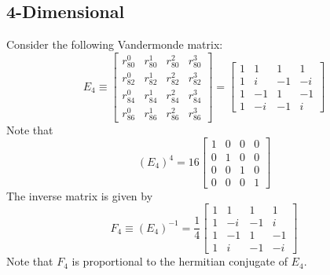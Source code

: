 \subsection{4-Dimensional}
Consider the following Vandermonde matrix:
\begin{equation}
    E_{4} \equiv \begin{bmatrix}
        r_{80}^{0} & r_{80}^{1} & r_{80}^{2} & r_{80}^{3} \\
        r_{82}^{0} & r_{82}^{1} & r_{82}^{2} & r_{82}^{3} \\
        r_{84}^{0} & r_{84}^{1} & r_{84}^{2} & r_{84}^{3} \\
        r_{86}^{0} & r_{86}^{1} & r_{86}^{2} & r_{86}^{3}
    \end{bmatrix} = \begin{bmatrix}
        1 & 1 & 1 & 1 \\
        1 & i & -1 & -i \\
        1 & -1 & 1 & -1 \\
        1 & -i & -1 & i
    \end{bmatrix}
\end{equation}
Note that
\begin{equation}
    \left( E_{4} \right)^{4} = 16 \begin{bmatrix}
        1 & 0 & 0 & 0 \\
        0 & 1 & 0 & 0 \\
        0 & 0 & 1 & 0 \\
        0 & 0 & 0 & 1
    \end{bmatrix}
\end{equation}
The inverse matrix is given by
\begin{equation}
    F_{4} \equiv \left( E_{4} \right)^{-1} = \frac{1}{4} \begin{bmatrix}
        1 & 1 & 1 & 1 \\
        1 & -i & -1 & i \\
        1 & -1 & 1 & -1 \\
        1 & i & -1 & -i
    \end{bmatrix}
\end{equation}
Note that $F_{4}$ is proportional to the hermitian conjugate of $E_{4}$.
